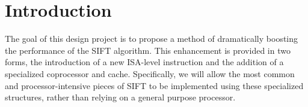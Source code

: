 \section{Introduction}
The goal of this design project is to propose a method of dramatically boosting the performance of the SIFT algorithm. This enhancement is provided in two forms, the introduction of a new ISA-level instruction and the addition of a specialized coprocessor and cache. Specifically, we will allow the most common and processor-intensive pieces of SIFT to be implemented using these specialized structures, rather than relying on a general purpose processor. 
